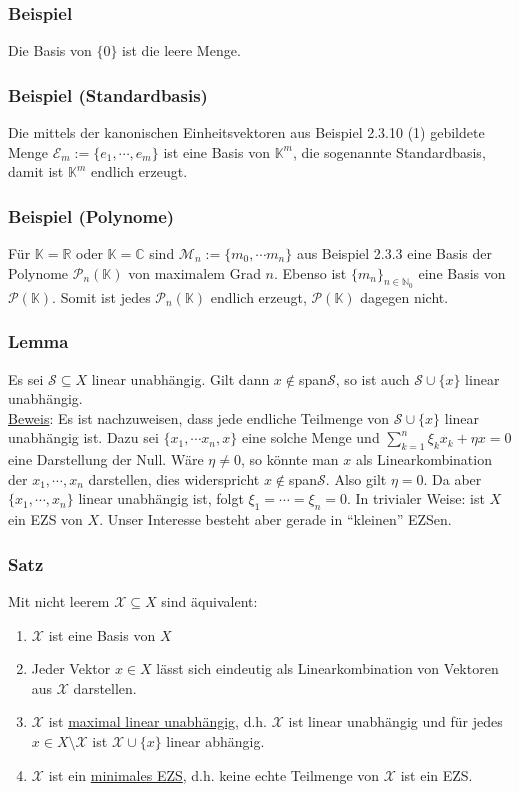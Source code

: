 \subsubsection{Beispiel}
Die Basis von $\{0\}$ ist die leere Menge.
\subsubsection{Beispiel (Standardbasis)}
Die mittels der kanonischen Einheitsvektoren aus Beispiel 2.3.10 (1) gebildete Menge $\mathcal{E}_m:=\{e_1,\cdots ,e_m\}$ ist eine Basis von $\mathbb{K}^m$, die sogenannte Standardbasis, damit ist $\mathbb{K}^m$ endlich erzeugt.
\subsubsection{Beispiel (Polynome)}
Für $\mathbb{K}=\mathbb{R}$ oder $\mathbb{K}=\mathbb{C}$ sind $\mathcal{M}_n:=\{m_0,\cdots m_n\}$ aus Beispiel 2.3.3 eine Basis der Polynome $\mathcal{P}_n(\mathbb{K})$ von maximalem Grad $n$.  Ebenso ist $\{m_n\}_{n\in\mathbb{N}_0}$ eine Basis von $\mathcal{P}(\mathbb{K})$.  Somit ist jedes $\mathcal{P}_n(\mathbb{K})$ endlich erzeugt, $\mathcal{P}(\mathbb{K})$ dagegen nicht.
\subsubsection{Lemma}
Es sei $\mathcal{S}\subseteq X$ linear unabhängig.  Gilt dann $x\not\in$span$\mathcal{S}$, so ist auch $\mathcal{S}\cup\{x\}$ linear unabhängig. \\
\underline{Beweis}:  Es ist nachzuweisen, dass jede endliche Teilmenge von $\mathcal{S}\cup\{x\}$ linear unabhängig ist.  Dazu sei $\{x_1,\cdots x_n,x\}$ eine solche Menge und $\sum_{k=1}^n \xi _k x_k +\eta x=0$ eine Darstellung der Null.  Wäre $\eta \not= 0$, so könnte man $x$ als Linearkombination der $x_1,\cdots ,x_n$ darstellen, dies widerspricht $x\not\in$span$\mathcal{S}$.  Also gilt $\eta = 0$.  Da aber $\{x_1,\cdots ,x_n\}$ linear unabhängig ist, folgt $\xi _1 = \cdots = \xi _n = 0$.  In trivialer Weise: ist $X$ ein EZS von $X$.  Unser Interesse besteht aber gerade in "`kleinen"' EZSen.
\subsubsection{Satz}
Mit nicht leerem $\mathcal{X}\subseteq X$ sind äquivalent:
\renewcommand{\labelenumi}{(\alph{enumi})}
\begin{enumerate}
\item $\mathcal{X}$ ist eine Basis von $X$
\item Jeder Vektor $x\in X$ lässt sich eindeutig als Linearkombination von Vektoren aus $\mathcal{X}$ darstellen.
\item $\mathcal{X}$ ist \underline{maximal linear unabhängig}, d.h. $\mathcal{X}$ ist linear unabhängig und für jedes $x\in X\setminus \mathcal{X}$ ist $\mathcal{X}\cup\{x\}$ linear abhängig.
\item $\mathcal{X}$ ist ein \underline{minimales EZS}, d.h. keine echte Teilmenge von $\mathcal{X}$ ist ein EZS.
\end{enumerate}
